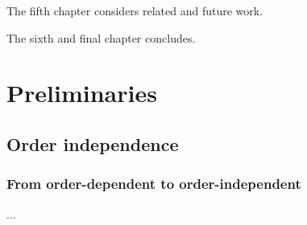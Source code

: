 The fifth chapter considers related and future work.

The sixth and final chapter concludes.

\section{Preliminaries}
\label{sec:prel}

\subsection{Order independence}

\subsubsection{From order-dependent to order-independent}

...
